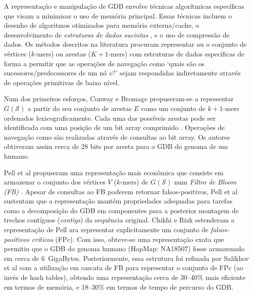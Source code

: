 \documentclass[12pt, a4paper, oneside]{article}
\newcommand{\str}[1]{\ensuremath{\mathtt{#1}}\xspace}
\newcommand{\strset}[1]{\ensuremath{\mathcal{#1}}\xspace}
\newcommand{\ssS}{\strset{S}}
\begin{document}

A representação e manipulação de GDB envolve técnicas algorítmicas específicas que visam a minimisar o uso de memória principal. Essas técnicas incluem o desenho de algoritmos otimizados para memória externa/cache, o desenvolvimento de \emph{estruturas de dados sucintas} \cite{Jacobson1989}, e o uso de compressão de dados.
Os métodos  descritos na literatura procuram representar ou o conjunto de vértices ($k$-mers) ou arestas ($K+1$-mers) com estruturas de dados específicas de forma a permitir que as operações de navegação como `quais são os sucessores/predecessores de um nó $v$?' sejam respondidas indiretamente através de operações primitivas de baixo nível. 

Num dos primeiros esforços, Conway e Bromage \cite{Conway2011} propuseram-se a representar $G(\ssS)$ a partir do seu conjunto de arestas $E$ como um conjunto de $k+1$-mers ordenados lexicograficamente. Cada uma das possíveis arestas pode ser identificada com uma posição de um bit array comprimido  \cite{Okanohara2007}. 
Operações de navegação como são realizadas através de consultas ao bit array.
Os autores obtiveram assim cerca de 28 bits por aresta para o GDB do genoma de um humano.


Pell et al \cite{Pell2012} propuseram uma representação mais econômica que consiste em armazenar o conjunto dos vértices $V$ ($k$-mers) de  $G(\ssS)$ num \emph{Filtro de Bloom (FB)} \cite{Bloom1970}.
Apesar de consultas ao FB poderem retornar falsos-positivos, Pell et al sustentam que a representação mantém propriedades 
adequadas para tarefas como a decomposição do GDB em componentes para a posterior montagem de trechos contíguos (\emph{contigs}) da sequência original.   
Chikhi e Rizk \cite{Chikhi2013} estenderam a representação de Pell ara representar explicitamente um conjunto de \emph{falsos-positivos críticos} (FPc). Com isso, obteve-se uma representação exata que permitiu que o GDB do genoma humano (HapMap: NA18507) fosse armazenado em cerca de 6~GigaBytes. Posteriormente, essa estrutura foi refinada por Salikhov et al \cite{Salikhov2014} com a utilização em cascata de FB para representar o conjunto de FPc (ao invés de hash tables), obtendo uma representação cerca de 30--40\% mais eficiente em termos de memória, e 18--30\% em termos de tempo de percurso do GDB.
\end{document}

